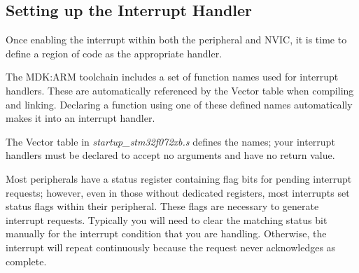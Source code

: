 \documentclass[11pt,fleqn]{book} %
\makeatletter
\newcommand{\ilcode}[1]{
    \smallskip
    \colorbox{gray!20!white}{
        \centering
        \parbox{\linewidth-2\fboxsep}{
            \lstinline@#1@
        }
    }
}
\makeatother
\begin{document}
%    
%    
%    
%    
%    



\subsection{Setting up the Interrupt Handler}  \label{handler_setup}
Once enabling the interrupt within both the peripheral and NVIC, it is time to define a region of code as the appropriate handler. 

The MDK:ARM toolchain includes a set of function names used for interrupt handlers. These are automatically referenced by the Vector table when compiling and linking. Declaring a function using one of these defined names automatically makes it into an interrupt handler.

The Vector table in \textit{startup\_stm32f072xb.s} defines the names; your interrupt handlers must be declared to accept no arguments and have no return value. 

Most peripherals have a status register containing flag bits for pending interrupt requests; however, even in those without dedicated registers, most interrupts set status flags within their peripheral. These flags are necessary to generate interrupt requests. Typically you will need to clear the matching status bit manually for the interrupt condition that you are handling. Otherwise, the interrupt will repeat continuously because the request never acknowledges as complete. 
\end{document}
